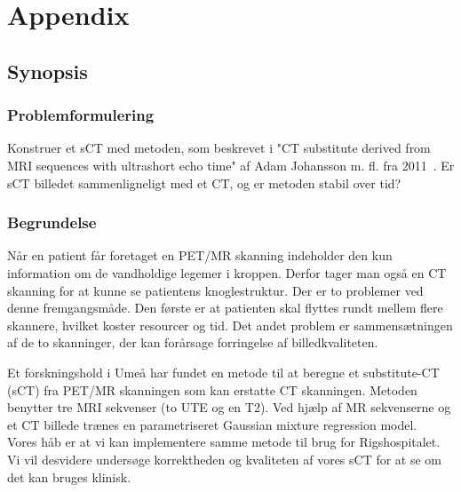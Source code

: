 \section{Appendix}

\subsection{Synopsis}

\subsubsection{Problemformulering}
Konstruer et sCT med metoden, som beskrevet i "CT substitute derived from 
MRI sequences with ultrashort echo time" af Adam Johansson m. fl. fra 2011~\cite{johansson}.
Er sCT billedet sammenligneligt med et CT, og er metoden stabil over tid?

\subsubsection{Begrundelse}
Når en patient får foretaget en PET/MR skanning indeholder den kun
information om de vandholdige legemer i kroppen. Derfor tager man også en
CT skanning for at kunne se patientens knoglestruktur. Der er to problemer
ved denne fremgangsmåde. Den første er at patienten skal flyttes rundt
mellem flere skannere, hvilket koster resourcer og tid. Det andet problem
er sammensætningen af de to skanninger, der kan forårsage forringelse af
billedkvaliteten.

Et forskningshold i Umeå har fundet en metode til at beregne et
substitute-CT (sCT) fra PET/MR skanningen som kan erstatte CT skanningen.
Metoden benytter tre MRI sekvenser (to UTE og en T2). Ved hjælp af MR sekvenserne
og et CT billede trænes en parametriseret Gaussian mixture regression model.\\

Vores håb er at vi kan implementere samme metode til brug for Rigshospitalet.
Vi vil desvidere undersøge korrektheden og kvaliteten af vores sCT for at se
om det kan bruges klinisk.\\

